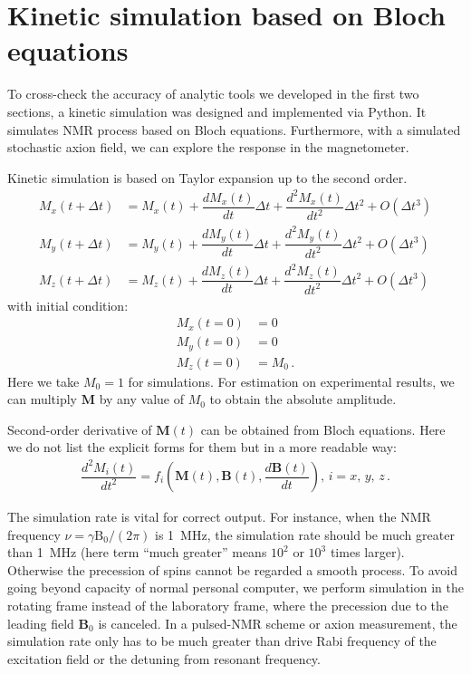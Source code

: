 \section{Kinetic simulation based on Bloch equations}\label{sec:Kinetic_simulation}

To cross-check the accuracy of analytic tools we developed in the first two sections, a kinetic simulation was designed and implemented via Python. It simulates NMR process based on Bloch equations. Furthermore, with a simulated stochastic axion field, we can explore the response in the magnetometer. 

Kinetic simulation is based on Taylor expansion up to the second order. 
\begin{align}
    M_{x}(t+\Delta t) &=  M_{x}(t) + \dfrac{d M_x(t)}{dt}\Delta t + \dfrac{d^2 M_x(t)}{dt^2}\Delta t^2 + O(\Delta t^3) \\
    M_{y}(t+\Delta t)  &= M_{y}(t) + \dfrac{d M_y(t)}{dt}\Delta t + \dfrac{d^2 M_y(t)}{dt^2}\Delta t^2 + O(\Delta t^3) \\
    M_{z}(t+\Delta t)  &= M_{z}(t) + \dfrac{d M_z(t)}{dt}\Delta t + \dfrac{d^2 M_z(t)}{dt^2}\Delta t^2 + O(\Delta t^3)\,
\end{align}
with initial condition:
\begin{align}
    M_{x}(t=0) &= 0\\
    M_{y}(t=0) &= 0\\
    M_{z}(t=0) &= M_0\,.
\end{align}
Here we take $ M_0 = 1$ for simulations. For estimation on experimental results, we can multiply $\mathbf{M}$ by any value of $M_0$ to obtain the absolute amplitude. 

Second-order derivative of $\mathbf{M}(t)$ can be obtained from Bloch equations. Here we do not list the explicit forms for them but in a more readable way:
\begin{align}
    \dfrac{d^2 M_i(t)}{dt^2} = f_{i}(\mathbf{M}(t), \mathbf{B}(t), \dfrac{d \mathbf{B}(t)}{dt}),\,i = x,\,y,\,z\,. 
\end{align}

The simulation rate is vital for correct output. For instance, when the NMR frequency $\nu = \gamma \mathrm{B}_0/(2\pi)$ is \SI{1}{\MHz}, the simulation rate should be much greater than \SI{1}{\MHz} (here term ``much greater'' means $10^2$ or $10^3$ times larger). Otherwise the precession of spins cannot be regarded a smooth process. To avoid going beyond capacity of normal personal computer, we perform simulation in the rotating frame instead of the laboratory frame, where the precession due to the leading field $\mathbf{B}_0$ is canceled. In a pulsed-NMR scheme or axion measurement, the simulation rate only has to be much greater than drive Rabi frequency of the excitation field or the detuning from resonant frequency. 

